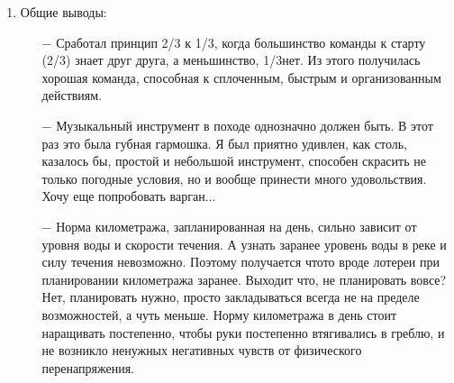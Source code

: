 \begin{enumerate}
\begin{enumerate}
		\item[$-$] Газовая плитка. Неоднозначная вещь, взятая с собой Димой. Один раз на ней мы приготовили плов и несколько раз вскипятили воды на чай. Имеет право на жизнь, места и веса много не занимает. Но тащить их несколько на 6 человек бессмысленно при таком мероприятии, как наше. Вероятнее всего, будет правильно сказать, что это такой своеобразный запасной вариант.
		\item[$-$] Панама оправдала себя лучше, чем кепки. Нос и уши не обгорают на ярком солнце, будучи прикрыты полями панамы. Харизматичная фетровая шляпа С.Ю. была вне конкуренции.
		\item[$-$] Сплавляться при чувствительной и ещё незагорелой коже лучше в х/б с длинным рукавом. У меня на такой случай есть то-о-оненький камуфляжный костюм, но пойдет и обычная х/б рубашка. Стало жарко\mdash закатал рукава. Чувствуешь, что поджаривает солнышко\mdash раскатал и намочил водой. 
		\item[$-$] Более плотная курточка с капюшоном а\sdash ля штормовка\mdash однозначно должна быть. Только, не синтетическая. Вообще, судьба синтетических тканей в походе печальна. Обычно они заканчивают в костре. Исключение составляет разве что флис.
		\item[$-$] Сапоги. В этот раз в них был Ваня и это простительно\mdash они ехали у него на байдарке и никому не мешали. Остальные были либо в шлепанцах, либо босиком, либо в химзащите, как мы с Саней. Моё предпочтение при прохладной воде, непогоде и просто нежелании мочить ноги\mdash за химзащитой по причине легкости, компактности и дешевизны.
	\end{enumerate}
\item Общие выводы:
	\begin{enumerate}
		\item[$-$] Сработал принцип 2/3 к 1/3, когда большинство команды к старту (2/3) знает друг друга, а меньшинство, 1/3\mdash нет. Из этого получилась хорошая команда, способная к сплоченным, быстрым и организованным действиям.
		\item[$-$] Музыкальный инструмент в походе однозначно должен быть. В этот раз это была губная гармошка. Я был приятно удивлен, как столь, казалось бы, простой и небольшой инструмент, способен скрасить не только погодные условия, но и вообще принести много удовольствия. Хочу еще попробовать варган$\ldots$
		\item[$-$] Норма километража, запланированная на день, сильно зависит от уровня воды и скорости течения. А узнать заранее уровень воды в реке и силу течения невозможно. Поэтому получается что\sdash то вроде лотереи при планировании километража заранее. Выходит что, не планировать вовсе? Нет, планировать нужно, просто закладываться всегда не на пределе возможностей, а чуть меньше. Норму километража в день стоит наращивать постепенно, чтобы руки постепенно втягивались в греблю, и не возникло ненужных негативных чувств от физического перенапряжения.

\end{enumerate}
\end{enumerate}
